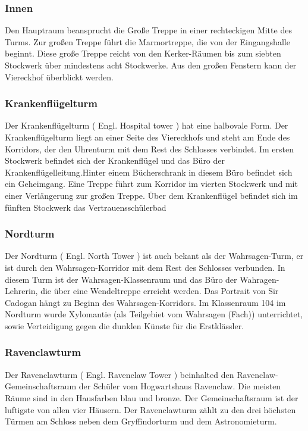 \documentclass[a4paper, 10pt]{article}
\begin{document}
\subsubsection*{\large Innen}
Den Hauptraum beansprucht die Große Treppe in einer rechteckigen Mitte des Turms. Zur großen Treppe führt die Marmortreppe, die von der Eingangshalle beginnt. Diese große Treppe reicht von den Kerker-Räumen bis zum siebten Stockwerk über mindestens acht Stockwerke. Aus den großen Fenstern kann der Viereckhof überblickt werden.
\subsubsection*{\large Krankenflügelturm}
Der Krankenflügelturm (  Engl.  Hospital tower ) hat eine halbovale Form. Der Krankenflügelturm liegt an einer Seite des Viereckhofs und steht am Ende des Korridors, der den Uhrenturm mit dem Rest des Schlosses verbindet. Im ersten Stockwerk befindet sich der Krankenflügel und das Büro der Krankenflügelleitung.Hinter einem Bücherschrank in diesem Büro befindet sich ein Geheimgang.
\vspace{10pt}
\newline
{}  
Eine Treppe führt zum Korridor im vierten Stockwerk und mit einer Verlängerung zur großen Treppe. Über dem Krankenflügel befindet sich im fünften Stockwerk das Vertrauensschülerbad
\subsubsection*{\large Nordturm}
Der Nordturm (  Engl.  North Tower ) ist auch bekant als der Wahrsagen-Turm, er ist durch den Wahrsagen-Korridor mit dem Rest des Schlosses verbunden. In diesem Turm ist der Wahrsagen-Klassenraum und das Büro der Wahragen-Lehrerin, die über eine Wendeltreppe erreicht werden. Das Portrait von Sir Cadogan hängt zu Beginn des Wahrsagen-Korridors.
\vspace{10pt}
\newline
{}  
Im Klassenraum 104 im Nordturm wurde Xylomantie (als Teilgebiet vom Wahrsagen (Fach)) unterrichtet, sowie Verteidigung gegen die dunklen Künste für die Erstklässler.
\subsubsection*{\large Ravenclawturm}
Der Ravenclawturm (  Engl.  Ravenclaw Tower ) beinhalted den Ravenclaw-Gemeinschaftsraum der Schüler vom Hogwartshaus Ravenclaw. Die meisten Räume sind in den Hausfarben blau und bronze. Der Gemeinschaftsraum ist der luftigste von allen vier Häusern.
\vspace{10pt}
\newline
{}  
Der Ravenclawturm zählt zu den drei höchsten Türmen am Schloss neben dem Gryffindorturm und dem Astronomieturm.
\end{document}
